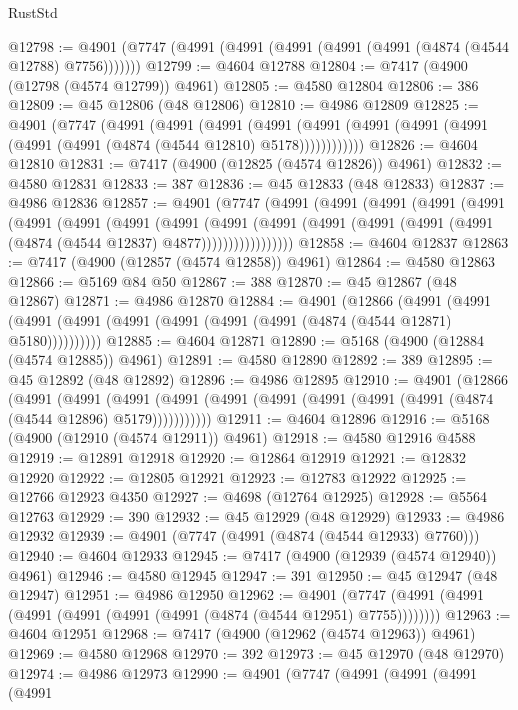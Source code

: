 \begin{lexlean}{RustStd}
\begin{coremodule}
@12798 := @4901 (@7747 (@4991 (@4991 (@4991 (@4991 (@4991 (@4874 (@4544 @12788) @7756)))))))
@12799 := @4604 @12788
@12804 := @7417 (@4900 (@12798 (@4574 @12799)) @4961)
@12805 := @4580 @12804
@12806 := 386
@12809 := @45 @12806 (@48 @12806)
@12810 := @4986 @12809
@12825 := @4901
    (@7747
      (@4991
        (@4991
          (@4991
            (@4991 (@4991 (@4991 (@4991 (@4991 (@4991 (@4991 (@4874 (@4544 @12810) @5178))))))))))))
@12826 := @4604 @12810
@12831 := @7417 (@4900 (@12825 (@4574 @12826)) @4961)
@12832 := @4580 @12831
@12833 := 387
@12836 := @45 @12833 (@48 @12833)
@12837 := @4986 @12836
@12857 := @4901
    (@7747
      (@4991
        (@4991
          (@4991
            (@4991
              (@4991
                (@4991
                  (@4991
                    (@4991
                      (@4991
                        (@4991
                          (@4991
                            (@4991 (@4991 (@4991 (@4991 (@4874 (@4544 @12837) @4877)))))))))))))))))
@12858 := @4604 @12837
@12863 := @7417 (@4900 (@12857 (@4574 @12858)) @4961)
@12864 := @4580 @12863
@12866 := @5169 @84 @50
@12867 := 388
@12870 := @45 @12867 (@48 @12867)
@12871 := @4986 @12870
@12884 := @4901
    (@12866
      (@4991 (@4991 (@4991 (@4991 (@4991 (@4991 (@4991 (@4991 (@4874 (@4544 @12871) @5180))))))))))
@12885 := @4604 @12871
@12890 := @5168 (@4900 (@12884 (@4574 @12885)) @4961)
@12891 := @4580 @12890
@12892 := 389
@12895 := @45 @12892 (@48 @12892)
@12896 := @4986 @12895
@12910 := @4901
    (@12866
      (@4991
        (@4991
          (@4991 (@4991 (@4991 (@4991 (@4991 (@4991 (@4991 (@4874 (@4544 @12896) @5179)))))))))))
@12911 := @4604 @12896
@12916 := @5168 (@4900 (@12910 (@4574 @12911)) @4961)
@12918 := @4580 @12916 @4588
@12919 := @12891 @12918
@12920 := @12864 @12919
@12921 := @12832 @12920
@12922 := @12805 @12921
@12923 := @12783 @12922
@12925 := @12766 @12923 @4350
@12927 := @4698 (@12764 @12925)
@12928 := @5564 @12763
@12929 := 390
@12932 := @45 @12929 (@48 @12929)
@12933 := @4986 @12932
@12939 := @4901 (@7747 (@4991 (@4874 (@4544 @12933) @7760)))
@12940 := @4604 @12933
@12945 := @7417 (@4900 (@12939 (@4574 @12940)) @4961)
@12946 := @4580 @12945
@12947 := 391
@12950 := @45 @12947 (@48 @12947)
@12951 := @4986 @12950
@12962 := @4901 (@7747 (@4991 (@4991 (@4991 (@4991 (@4991 (@4991 (@4874 (@4544 @12951) @7755))))))))
@12963 := @4604 @12951
@12968 := @7417 (@4900 (@12962 (@4574 @12963)) @4961)
@12969 := @4580 @12968
@12970 := 392
@12973 := @45 @12970 (@48 @12970)
@12974 := @4986 @12973
@12990 := @4901
    (@7747
      (@4991
        (@4991
          (@4991
            (@4991

\end{coremodule}
\end{lexlean}

